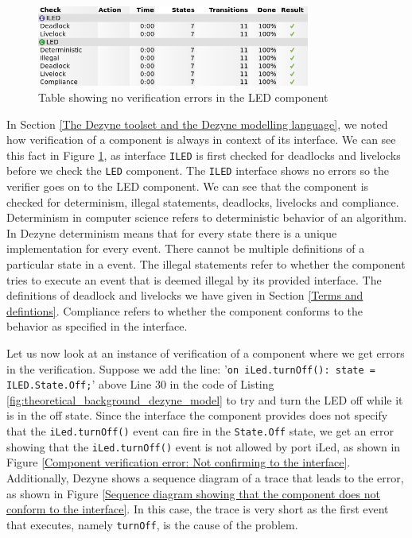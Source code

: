 \documentclass[12pt]{scrreprt}
\begin{document}
\begin{appendices}
\begin{figure}
    \centering
    \includegraphics[width=0.8\textwidth]{Figures/theoretical_background/led_verification.png}
    \caption{Table showing no verification errors in the LED component}
    \label{fig:Table showing no verifcation errors in the LED component}
\end{figure}

In Section \ref{The Dezyne toolset and the Dezyne modelling language}, we noted how verification of a component is always in context of its interface. We can see this fact in Figure \ref{fig:Table showing no verifcation errors in the LED component}, as interface \texttt{ILED} is first checked for deadlocks and livelocks before we check the \texttt{LED} component. The \texttt{ILED} interface shows no errors so the verifier goes on to the LED component. We can see that the component is checked for determinism, illegal statements, deadlocks, livelocks and compliance. Determinism in computer science refers to deterministic behavior of an algorithm. In Dezyne determinism means that for every state there is a unique implementation for every event. There cannot be multiple definitions of a particular state in a event.
The illegal statements refer to whether the component tries to execute an event that is deemed illegal by its provided interface. The definitions of deadlock and livelocks we have given in Section \ref{Terms and defintions}. Compliance refers to whether the component conforms to the behavior as specified in the interface.
\par
Let us now look at an instance of verification of a component where we get errors in the verification. Suppose we add the line: '\texttt{on iLed.turnOff(): state = ILED.State.Off;}' above Line 30 in the code of Listing \ref{fig:theoretical_background_dezyne_model} to try and turn the LED off while it is in the off state. Since the interface the component provides does not specify that the \texttt{iLed.turnOff()} event can fire in the \texttt{State.Off} state, we get an error showing that the \texttt{iLed.turnOff()} event is not allowed by port iLed, as shown in Figure \ref{Component verification error: Not confirming to the interface}. Additionally, Dezyne shows a sequence diagram of a trace that leads to the error, as shown in Figure \ref{Sequence diagram showing that the component does not conform to the interface}. In this case, the trace is very short as the first event that executes, namely \texttt{turnOff}, is the cause of the problem.


\end{appendices}
\end{document}
